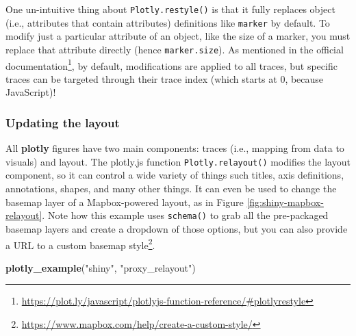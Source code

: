 \documentclass[
  12pt,
]{krantz}
\newenvironment{Shaded}{\begin{snugshade}}{\end{snugshade}}
\newcommand{\KeywordTok}[1]{\textcolor[rgb]{0.13,0.29,0.53}{\textbf{#1}}}
\newcommand{\NormalTok}[1]{#1}
\newcommand{\StringTok}[1]{\textcolor[rgb]{0.31,0.60,0.02}{#1}}
\renewcommand{\href}[2]{#2\footnote{\url{#1}}}
\begin{document}
One un-intuitive thing about \texttt{Plotly.restyle()} is that it fully replaces object (i.e., attributes that contain attributes) definitions like \texttt{marker} by default. To modify just a particular attribute of an object, like the size of a marker, you must replace that attribute directly (hence \texttt{marker.size}). As mentioned in the \href{https://plot.ly/javascript/plotlyjs-function-reference/\#plotlyrestyle}{official documentation}, by default, modifications are applied to all traces, but specific traces can be targeted through their trace index (which starts at 0, because JavaScript)!

\hypertarget{relayout}{%
\subsubsection{Updating the layout}\label{relayout}}

All \textbf{plotly} figures have two main components: traces (i.e., mapping from data to visuals) and layout. The plotly.js function \texttt{Plotly.relayout()} modifies the layout component, so it can control a wide variety of things such titles, axis definitions, annotations, shapes, and many other things. It can even be used to change the basemap layer of a Mapbox-powered layout, as in Figure \ref{fig:shiny-mapbox-relayout}. Note how this example uses \texttt{schema()} to grab all the pre-packaged basemap layers and create a dropdown of those options, but you can also provide a URL to a \href{https://www.mapbox.com/help/create-a-custom-style/}{custom basemap style}.

\begin{Shaded}
\begin{Highlighting}[]
\KeywordTok{plotly_example}\NormalTok{(}\StringTok{"shiny"}\NormalTok{, }\StringTok{"proxy_relayout"}\NormalTok{)}
\end{Highlighting}
\end{Shaded}
\end{document}
